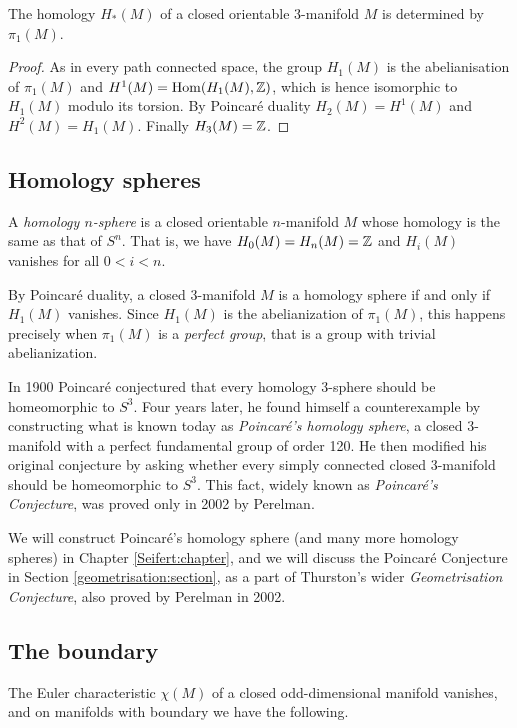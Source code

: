 \begin{prop}
The homology $H_*(M)$ of a closed orientable 3-manifold $M$ is determined by $\pi_1(M)$. 
\end{prop} 
\begin{proof}
As in every path connected space, the group $H_1(M)$ is the abelianisation of $\pi_1(M)$ and $H^1(M) = {\rm Hom}(H_1(M),\mathbb{Z})$, which is hence isomorphic to $H_1(M)$ modulo its torsion. By Poincar\'e duality $H_2(M) = H^1(M)$ and $H^2(M) = H_1(M)$. Finally $H_3(M) = \mathbb{Z}$.
\end{proof}

\subsection{Homology spheres}
A \emph{homology $n$-sphere} is a closed orientable $n$-manifold $M$ whose homology is the same as that of $S^n$. That is, we have $H_0(M) = H_n(M) = \mathbb{Z}$ and $H_i(M)$ vanishes for all $0<i<n$. 

By Poincar\'e duality, a closed 3-manifold $M$ is a homology sphere if and only if $H_1(M)$ vanishes. Since $H_1(M)$ is the abelianization of $\pi_1(M)$, this happens precisely when $\pi_1(M)$ is a \emph{perfect group}, that is a group with trivial abelianization. 

In 1900 Poincar\'e conjectured that every homology 3-sphere should be homeomorphic to $S^3$. Four years later, he found himself a counterexample by constructing what is known today as \emph{Poincar\'e's homology sphere}, a closed 3-manifold with a perfect fundamental group of order 120. He then modified his original conjecture by asking whether every simply connected closed 3-manifold should be homeomorphic to $S^3$. This fact, widely known as \emph{Poincar\'e's Conjecture}, was proved only in 2002 by Perelman.

We will construct Poincar\'e's homology sphere (and many more homology spheres) in Chapter \ref{Seifert:chapter}, and we will discuss the Poincar\'e Conjecture in Section \ref{geometrisation:section}, as a part of Thurston's wider \emph{Geometrisation Conjecture}, also proved by Perelman in 2002.

\subsection{The boundary}
The Euler characteristic $\chi(M)$ of a closed odd-dimensional manifold vanishes, and on manifolds with boundary we have the following.

